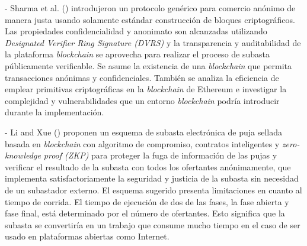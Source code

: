     - Sharma et al. (\citeyear{sharma2021}) introdujeron un protocolo genérico para comercio anónimo de 
    manera justa usando solamente estándar construcción de
    bloques criptográficos. Las propiedades confidencialidad y anonimato son alcanzadas utilizando 
    \textit{Designated Verifier Ring
    Signature (DVRS)} y la transparencia y auditabilidad de la plataforma \textit{blockchain} se aprovecha 
    para realizar el proceso de subasta
    públicamente verificable. Se asume la existencia de una \textit{blockchain} que permita transacciones 
    anónimas y confidenciales.
    También se analiza la eficiencia de emplear primitivas criptográficas en la \textit{blockchain} de 
    Ethereum e investigar la complejidad
    y vulnerabilidades que un entorno \textit{blockchain} podría introducir durante la implementación.


    - Li and Xue (\citeyear{li2021}) proponen un esquema de subasta electrónica de puja sellada basada en \textit{blockchain} con algoritmo de 
    compromiso, contratos inteligentes y \textit{zero-knowledge proof (ZKP)} para proteger la fuga de información de las pujas y verificar
    el resultado de la subasta con todos los ofertantes anónimamente, que implementa satisfactoriamente la seguridad y justicia de la 
    subasta sin necesidad de un subastador externo. El esquema sugerido presenta limitaciones en cuanto al 
    tiempo de corrida. El tiempo 
    de ejecución de dos de las fases, la fase abierta y fase final, está determinado por el número de 
    ofertantes. Esto significa que 
    la subasta se convertiría en un trabajo que consume mucho tiempo en el caso de ser usado en 
    plataformas abiertas como Internet.


